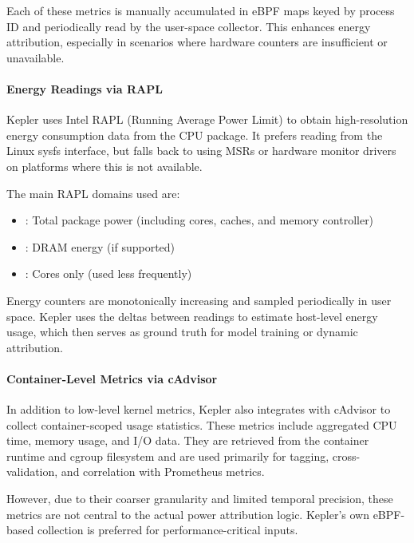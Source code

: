 Each of these metrics is manually accumulated in eBPF maps keyed by process ID and periodically read by the user-space collector. This enhances energy attribution, especially in scenarios where hardware counters are insufficient or unavailable.








\paragraph{Energy Readings via RAPL}

Kepler uses Intel RAPL (Running Average Power Limit) to obtain high-resolution energy consumption data from the CPU package. It prefers reading from the Linux  sysfs interface, but falls back to using MSRs or hardware monitor drivers on platforms where this is not available.

The main RAPL domains used are:
\begin{itemize}
  \item {}: Total package power (including cores, caches, and memory controller)
  \item {}: DRAM energy (if supported)
  \item {}: Cores only (used less frequently)
\end{itemize}

Energy counters are monotonically increasing and sampled periodically in user space. Kepler uses the deltas between readings to estimate host-level energy usage, which then serves as ground truth for model training or dynamic attribution.







\paragraph{Container-Level Metrics via cAdvisor}

In addition to low-level kernel metrics, Kepler also integrates with cAdvisor to collect container-scoped usage statistics. These metrics include aggregated CPU time, memory usage, and I/O data. They are retrieved from the container runtime and cgroup filesystem and are used primarily for tagging, cross-validation, and correlation with Prometheus metrics.

However, due to their coarser granularity and limited temporal precision, these metrics are not central to the actual power attribution logic. Kepler’s own eBPF-based collection is preferred for performance-critical inputs.






